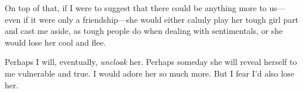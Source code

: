 \documentclass[a4paper, 12pt]{article}
\begin{document}
On top of that, if I were to suggest that there could be anything more to
us—even if it were only a friendship—she would either calmly play her tough girl
part and cast me aside, as tough people do when dealing with sentimentals, or
she would lose her cool and flee.

Perhaps I will, eventually, \textit{uncloak} her. Perhaps someday she will
reveal herself to me vulnerable and true. I would adore her so much more. But I fear
I'd also lose her.
\end{document}
